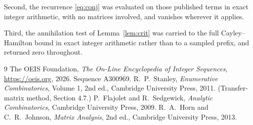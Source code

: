 \documentclass[11pt,a4paper]{article}
\theoremstyle{plain}
\theoremstyle{definition}
\begin{document}
Second, the recurrence \eqref{eq:conj} was evaluated on those published terms in exact
integer arithmetic, with no matrices involved, and vanishes wherever it applies.

Third, the annihilation test of Lemma~\ref{lem:crit} was carried to the full
Cayley--Hamilton bound in exact integer arithmetic rather than to a sampled prefix, and
returned zero throughout.

\begin{thebibliography}{9}
 The OEIS Foundation, \emph{The On-Line Encyclopedia of Integer
Sequences}, \url{https://oeis.org}, 2026. Sequence A300969.
 R.~P.~Stanley, \emph{Enumerative Combinatorics}, Volume 1, 2nd ed.,
Cambridge University Press, 2011. (Transfer-matrix method, Section 4.7.)
 P.~Flajolet and R.~Sedgewick, \emph{Analytic Combinatorics}, Cambridge
University Press, 2009.
 R.~A.~Horn and C.~R.~Johnson, \emph{Matrix Analysis}, 2nd ed., Cambridge
University Press, 2013.
\end{thebibliography}
\end{document}
